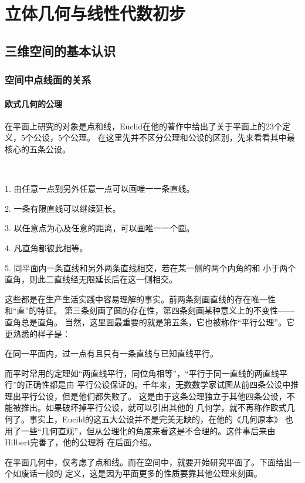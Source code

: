 \part{立体几何与线性代数初步}



\chapter{三维空间的基本认识}
\section{空间中点线面的关系}
\subsection{欧式几何的公理}
在平面上研究的对象是点和线，Euclid在他的著作中给出了关于平面上的23个定义，5个公设，5个公理。
在这里先并不区分公理和公设的区别，先来看看其中最核心的五条公设。
\begin{axiom}[Euclid的五大公设]\label{欧式公理}
\ 

1. 由任意一点到另外任意一点可以画唯一一条直线。

2. 一条有限直线可以继续延长。

3. 以任意点为心及任意的距离，可以画唯一一个圆。

4. 凡直角都彼此相等。

5. 同平面内一条直线和另外两条直线相交，若在某一侧的两个内角的和
小于两个直角，则此二直线经无限延长后在这一侧相交。
\end{axiom}
这些都是在生产生活实践中容易理解的事实。前两条刻画直线的存在唯一性和“直”的特征。
第三条刻画了圆的存在性，第四条刻画某种意义上的不变性——直角总是直角。
当然，这里面最重要的就是第五条，它也被称作“平行公理”。它更熟悉的样子是：
\begin{axiom}[平行公设]
    在同一平面内，过一点有且只有一条直线与已知直线平行。
\end{axiom}

而平时常用的定理如“两直线平行，同位角相等”，“平行于同一直线的两直线平行”的正确性都是由
平行公设保证的。千年来，无数数学家试图从前四条公设中推理出平行公设，但是他们都失败了。
这是由于这条公理独立于其他四条公设，不能被推出。如果破坏掉平行公设，就可以引出其他的
几何学，就不再称作欧式几何了。事实上，Eucild的这五大公设并不是完美无缺的，在他的《几何原本》
也用了一些“几何直观”，但从公理化的角度来看这是不合理的。这件事后来由Hilbert完善了，他的公理将
在后面介绍。

在平面几何中，仅考虑了点和线。而在空间中，就要开始研究平面了。下面给出一个如废话一般的
定义，这是因为平面更多的性质要靠其他公理来刻画。

